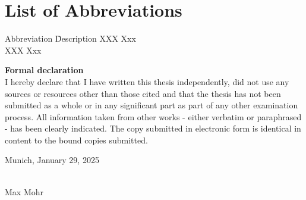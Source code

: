 \documentclass[12pt, a4paper, titlepage]{article}
\begin{document}
\newpage
\tableofcontents

\newpage
\section*{List of Abbreviations}
\begin{tabbing}
    Abbreviation \hspace{1cm} \= Description \kill
    XXX \> Xxx \\
    XXX \> Xxx \\
\end{tabbing}

\newpage
\listoftables
{}

\newpage
\listoffigures
{}


\clearpage
{} %









\clearpage
{} %
\setcounter{page}{7}
\printbibliography
{}

\newpage
{\Large\textbf{Formal declaration}}\\

I hereby declare that I have written this thesis independently, did not use any sources or resources other than those cited and that the thesis has not been submitted as a whole or in any significant part as part of any other examination process. All information taken from other works - either verbatim or paraphrased - has been clearly indicated. The copy submitted in electronic form is identical in content to the bound copies submitted.

\vspace{1cm}

Munich, January 29, 2025

\vspace{1cm}
\makebox[5cm]{\hrulefill}\\
Max Mohr
\end{document}
